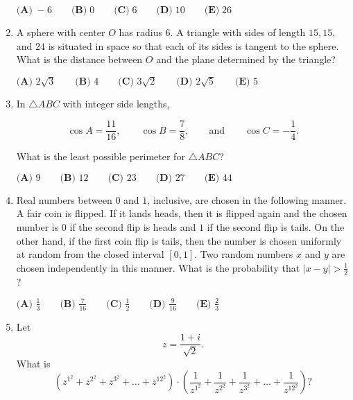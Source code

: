 \documentclass{article}
\begin{document}
\begin{enumerate}[label=\arabic*., itemsep=0.5em]
\(\textbf{(A)} \; -6 \qquad \textbf{(B)} \; 0 \qquad \textbf{(C)} \; 6 \qquad \textbf{(D)} \; 10 \qquad \textbf{(E)} \; 26\)\par \vspace{0.5em}\item A sphere with center \(O\) has radius \(6\). A triangle with sides of length \(15, 15,\) and \(24\) is situated in space so that each of its sides is tangent to the sphere. What is the distance between \(O\) and the plane determined by the triangle?

\(
\textbf{(A) }2\sqrt{3}\qquad
\textbf{(B) }4\qquad
\textbf{(C) }3\sqrt{2}\qquad
\textbf{(D) }2\sqrt{5}\qquad
\textbf{(E) }5\qquad
\)\par \vspace{0.5em}\item In \(\triangle ABC\) with integer side lengths,

\begin{equation*}
\cos A=\frac{11}{16}, \qquad \cos B= \frac{7}{8}, \qquad \text{and} \qquad\cos C=-\frac{1}{4}.
\end{equation*}

What is the least possible perimeter for \(\triangle ABC\)?

\(\textbf{(A) } 9 \qquad \textbf{(B) } 12 \qquad \textbf{(C) } 23 \qquad \textbf{(D) } 27 \qquad \textbf{(E) } 44\)\par \vspace{0.5em}\item Real numbers between \(0\) and \(1\), inclusive, are chosen in the following manner. A fair coin is flipped. If it lands heads, then it is flipped again and the chosen number is \(0\) if the second flip is heads and \(1\) if the second flip is tails. On the other hand, if the first coin flip is tails, then the number is chosen uniformly at random from the closed interval \([0,1]\). Two random numbers \(x\) and \(y\) are chosen independently in this manner. What is the probability that \(|x-y| > \tfrac{1}{2}\)?

\(\textbf{(A) } \frac{1}{3} \qquad \textbf{(B) } \frac{7}{16} \qquad \textbf{(C) } \frac{1}{2} \qquad \textbf{(D) } \frac{9}{16} \qquad \textbf{(E) } \frac{2}{3}\)\par \vspace{0.5em}\item Let 
\begin{equation*}
z=\frac{1+i}{\sqrt{2}}.
\end{equation*}
What is 
\begin{equation*}
\left(z^{1^2}+z^{2^2}+z^{3^2}+\dots+z^{{12}^2}\right) \cdot \left(\frac{1}{z^{1^2}}+\frac{1}{z^{2^2}}+\frac{1}{z^{3^2}}+\dots+\frac{1}{z^{{12}^2}}\right)?
\end{equation*}



\end{enumerate}
\end{document}
